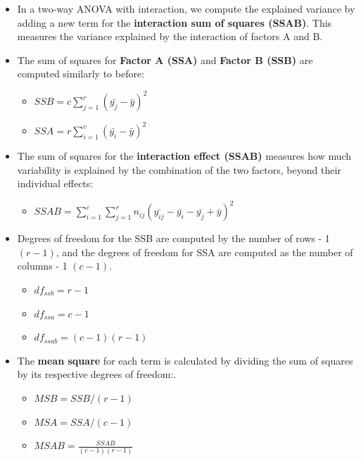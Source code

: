 \documentclass[
  letterpaper,
  DIV=11,
  numbers=noendperiod]{scrreprt}
\providecommand{\tightlist}{%
  \setlength{\itemsep}{0pt}\setlength{\parskip}{0pt}}\usepackage{longtable,booktabs,array}
\begin{document}
\begin{itemize}
\item
  In a two-way ANOVA with interaction, we compute the explained variance
  by adding a new term for the
  \textbf{interaction sum of squares (SSAB)}. This measures the variance
  explained by the interaction of factors A and B.
\item
  The sum of squares for \textbf{Factor A (SSA)} and
  \textbf{Factor B (SSB)} are computed similarly to before:

  \begin{itemize}
  \tightlist
  \item
    \(SSB = c \sum^r_{j=1}{(\bar{y_j}-\bar{y}) ^2}\)
  \item
    \(SSA = r \sum^c_{i=1}{(\bar{y_i}-\bar{y}) ^2}\)
  \end{itemize}
\item
  The sum of squares for the \textbf{interaction effect (SSAB)} measures
  how much variability is explained by the combination of the two
  factors, beyond their individual effects:

  \begin{itemize}
  \tightlist
  \item
    \(SSAB = \sum^c_{i=1} \sum^r_{j=1} n_{ij} (\bar{y_{ij}} - \bar{y_i} - \bar{y_j} + \bar{y})^2\)
  \end{itemize}
\item
  Degrees of freedom for the SSB are computed by the number of rows - 1
  \((r-1)\), and the degrees of freedom for SSA are computed as the
  number of columns - 1 \((c-1)\).

  \begin{itemize}
  \tightlist
  \item
    \(df_{ssb} = r-1\)
  \item
    \(df_{ssa} = c-1\)
  \item
    \(df_{ssab} = (c-1)(r-1)\)
  \end{itemize}
\item
  The \textbf{mean square} for each term is calculated by dividing the
  sum of squares by its respective degrees of freedom:.

  \begin{itemize}
  \tightlist
  \item
    \(MSB = SSB/(r-1)\)
  \item
    \(MSA = SSA/(c-1)\)
  \item
    \(MSAB = \frac{SSAB}{(c-1)(r-1)}\)
  \end{itemize}
\end{itemize}
\end{document}
